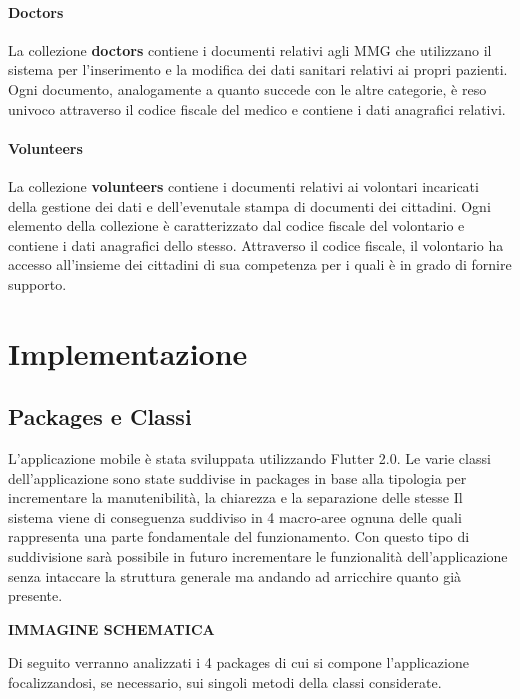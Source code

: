 \documentclass[12pt,a4paper,twoside,openright,titlepage]{book}
\begin{document}
\subsubsection{Doctors}
La collezione \textbf{doctors} contiene i documenti relativi agli MMG che utilizzano il sistema per l'inserimento e la modifica dei dati sanitari relativi ai propri pazienti. Ogni documento, analogamente a quanto succede con le altre categorie, è reso univoco attraverso il codice fiscale del medico e contiene i dati anagrafici relativi.

\subsubsection{Volunteers}
La collezione \textbf{volunteers} contiene i documenti relativi ai volontari incaricati della gestione dei dati e dell'evenutale stampa di documenti dei cittadini. Ogni elemento della collezione è caratterizzato dal codice fiscale del volontario e contiene i dati anagrafici dello stesso. Attraverso il codice fiscale, il volontario ha accesso all'insieme dei cittadini di sua competenza per i quali è in grado di fornire supporto.

\chapter{Implementazione}
\section{Packages e Classi}
L'applicazione mobile è stata sviluppata utilizzando Flutter 2.0. Le varie classi dell'applicazione sono state suddivise in packages in base alla tipologia per incrementare la manutenibilità, la chiarezza e la separazione delle stesse Il sistema viene di conseguenza suddiviso in 4 macro-aree ognuna delle quali rappresenta una parte fondamentale del funzionamento. Con questo tipo di suddivisione sarà possibile in futuro incrementare le funzionalità dell'applicazione senza intaccare la struttura generale ma andando ad arricchire quanto già presente.\newline

\textbf{IMMAGINE SCHEMATICA}\newline

Di seguito verranno analizzati i 4 packages di cui si compone l'applicazione focalizzandosi, se necessario, sui singoli metodi della classi considerate.
\end{document}
